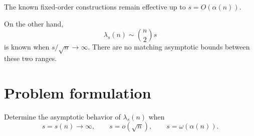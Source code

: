 \documentclass[11pt,a4paper]{article}
\theoremstyle{definition}
\begin{document}
The known fixed-order
constructions remain effective up to $s=O(\alpha(n))$.

On the other hand,
\begin{equation}
  \lambda_s(n)\sim\binom{n}{2}s
\end{equation}
is known when $s/\sqrt n\to\infty$. There are no matching asymptotic bounds
between these two ranges.

\section{Problem formulation}
Determine the asymptotic behavior of $\lambda_s(n)$ when
\begin{equation}
  s=s(n)\longrightarrow\infty,
  \qquad
  s=o(\sqrt n),
  \qquad
  s=\omega(\alpha(n)).
\end{equation}
\end{document}
